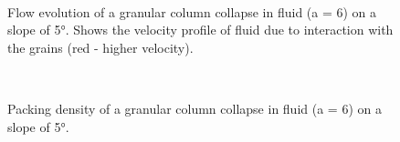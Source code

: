 \begin{figure}
\ContinuedFloat
{}\\
\caption[Flow evolution of a granular column collapse in fluid (a = 6) on a 
slope of 5\si{\degree}]{Flow evolution of a granular column collapse in fluid 
(a = 6) on a slope of 5\si{\degree}. Shows the velocity profile of fluid due to 
interaction with the grains (red - higher velocity).}
\label{fig:a6_slope_snapshots}
\end{figure}



\begin{figure}
\\
\caption{Packing density of a granular column collapse in fluid (a = 6) on a 
slope of 5\si{\degree}.}
\label{fig:a6_slope_voro}
\end{figure}



